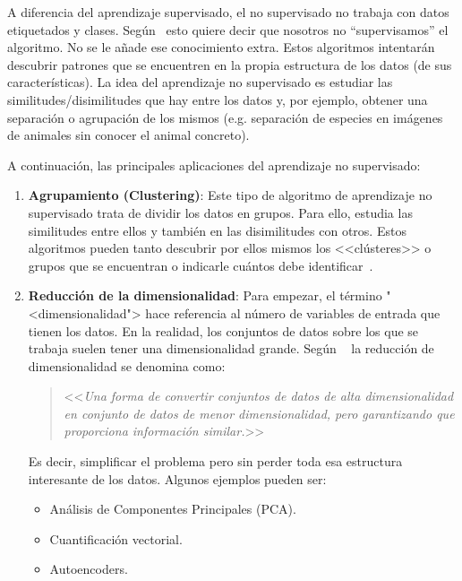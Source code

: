 A diferencia del aprendizaje supervisado, el no supervisado no trabaja con datos etiquetados y clases. Según~\cite{salim:usl} esto quiere decir que nosotros no ``supervisamos'' el algoritmo. No se le añade ese conocimiento extra. Estos algoritmos intentarán descubrir patrones que se encuentren en la propia estructura de los datos (de sus características). La idea del aprendizaje no supervisado es estudiar las similitudes/disimilitudes que hay entre los datos y, por ejemplo, obtener una separación o agrupación de los mismos (e.g. separación de especies en imágenes de animales sin conocer el animal concreto).
 
A continuación, las principales aplicaciones del aprendizaje no supervisado:
\vspace{-4px}
\begin{enumerate}
    \item \textbf{Agrupamiento (Clustering)}: Este tipo de algoritmo de
    aprendizaje no supervisado trata de dividir los datos en grupos. Para ello,
    estudia las similitudes entre ellos y también en las disimilitudes con
    otros. Estos algoritmos pueden tanto descubrir por ellos mismos los
    <<clústeres>> o grupos que se encuentran o indicarle cuántos debe
    identificar~\cite{salim:usl}.
    \item \textbf{Reducción de la dimensionalidad}: Para empezar, el término
    "<dimensionalidad"> hace referencia al número de variables de entrada que
    tienen los datos. En la realidad, los conjuntos de datos sobre los que se
    trabaja suelen tener una dimensionalidad grande. Según
   ~\cite{javatpoint:reduccionsdims} la reducción de dimensionalidad se denomina
    como: \begin{quote}<<\textit{Una forma de convertir conjuntos de datos de alta dimensionalidad en
    conjunto de datos de menor dimensionalidad, pero garantizando que proporciona
    información similar.}>>\end{quote} Es decir, simplificar el problema pero sin perder
    toda esa estructura interesante de los datos. Algunos ejemplos pueden ser:
    \begin{itemize}
        \item Análisis de Componentes Principales (PCA).
        \item Cuantificación vectorial.
        \item Autoencoders.
    \end{itemize}
\end{enumerate}


